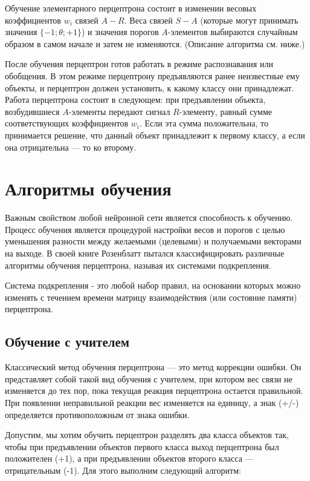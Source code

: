 Обучение элементарного перцептрона состоит в изменении весовых коэффициентов $w_i$ связей $A-R$. Веса связей $S-A$ (которые могут принимать значения $\{-1; \theta; +1\}$) и значения порогов $A$-элементов выбираются случайным образом в самом начале и затем не изменяются. (Описание алгоритма см. ниже.)

После обучения перцептрон готов работать в режиме распознавания или обобщения. В этом режиме перцептрону предъявляются ранее неизвестные ему объекты, и перцептрон должен установить, к какому классу они принадлежат. Работа перцептрона состоит в следующем: при предъявлении объекта, возбудившиеся $A$-элементы передают сигнал $R$-элементу, равный сумме соответствующих коэффициентов $w_i$. Если эта сумма положительна, то принимается решение, что данный объект принадлежит к первому классу, а если она отрицательна — то ко второму.

\section{Алгоритмы обучения}
Важным свойством любой нейронной сети является способность к обучению. Процесс обучения является процедурой настройки весов и порогов с целью уменьшения разности между желаемыми (целевыми) и получаемыми векторами на выходе. В своей книге Розенблатт пытался классифицировать различные алгоритмы обучения перцептрона, называя их системами подкрепления.

Система подкрепления - это любой набор правил, на основании которых можно изменять с течением времени матрицу взаимодействия (или состояние памяти) перцептрона.

\subsection{Обучение с учителем}

Классический метод обучения перцептрона — это метод коррекции ошибки. Он представляет собой такой вид обучения с учителем, при котором вес связи не изменяется до тех пор, пока текущая реакция перцептрона остается правильной. При появлении неправильной реакции вес изменяется на единицу, а знак (+/-) определяется противоположным от знака ошибки.

Допустим, мы хотим обучить перцептрон разделять два класса объектов так, чтобы при предъявлении объектов первого класса выход перцептрона был положителен (+1), а при предъявлении объектов второго класса — отрицательным (-1). Для этого выполним следующий алгоритм:


